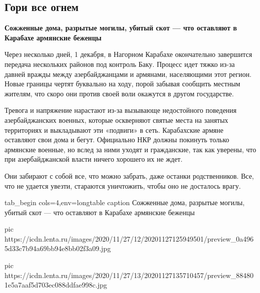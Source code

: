  
 
 
 
 
 
\subsection{Гори все огнем}
\label{sec:29_11_2020.news.ru.lenta_ru.1.gori_vse_ognem}


\begin{leftbar}
        \bfseries{\Large\color{red}
Сожженные дома, разрытые могилы, убитый скот --- что оставляют в Карабахе армянские беженцы
        }
\end{leftbar}

Через несколько дней, 1 декабря, в Нагорном Карабахе окончательно завершится
передача нескольких районов под контроль Баку. Процесс идет тяжко из-за давней
вражды между азербайджанцами и армянами, населяющими этот регион. Новые границы
чертят буквально на ходу, порой забывая сообщить местным жителям, что скоро они
против своей воли окажутся в другом государстве.

Тревога и напряжение нарастают из-за вызывающе недостойного поведения
азербайджанских военных, которые оскверняют святые места на занятых территориях
и выкладывают эти «подвиги» в сеть. Карабахские армяне оставляют свои дома и
бегут. Официально НКР должны покинуть только армянские военные, но вслед за
ними уходят и гражданские, так как уверены, что при азербайджанской власти
ничего хорошего их не ждет.

Они забирают с собой все, что можно забрать, даже останки родственников. Все,
что не удается увезти, стараются уничтожить, чтобы оно не досталось врагу.

\ifcmt
tab_begin cols=4,env=longtable
  caption Сожженные дома, разрытые могилы, убитый скот --- что оставляют в Карабахе армянские беженцы

pic https://icdn.lenta.ru/images/2020/11/27/12/20201127125949501/preview_0a4965d33c7b94a69bb94e8bb02f3a09.jpg

pic https://icdn.lenta.ru/images/2020/11/27/13/20201127135710457/preview_884801e5a7aaf5d703ec088ddfae998c.jpg

